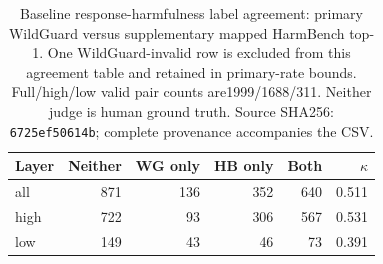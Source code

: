 \begin{table}[t]
\centering\small
\begin{tabular}{lrrrrr}
\toprule
Layer & Neither & WG only & HB only & Both & $\kappa$ \\
\midrule
all & 871 & 136 & 352 & 640 & 0.511 \\
high & 722 & 93 & 306 & 567 & 0.531 \\
low & 149 & 43 & 46 & 73 & 0.391 \\
\bottomrule
\end{tabular}
\caption{Baseline response-harmfulness label agreement: primary WildGuard versus supplementary mapped HarmBench top-1. One WildGuard-invalid row is excluded from this agreement table and retained in primary-rate bounds. Full/high/low valid pair counts are1999/1688/311. Neither judge is human ground truth. Source SHA256: \texttt{6725ef50614b}; complete provenance accompanies the CSV.}
\label{tab:wg-hb-alpha0}
\end{table}
